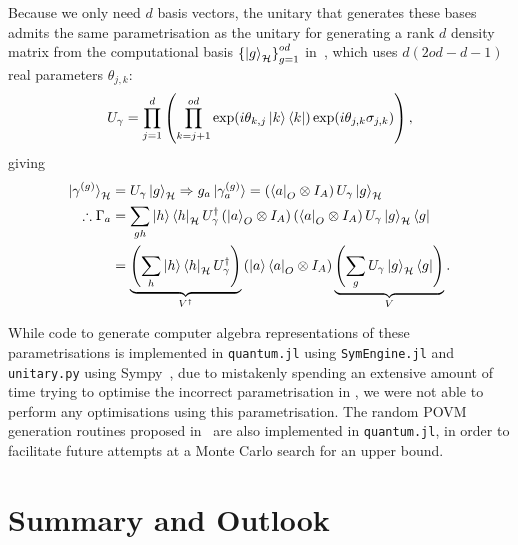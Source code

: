 \documentclass[10pt, a4paper]{article}
\numberwithin{equation}{section} %
\theoremstyle{definition}
\theoremstyle{plain}
\newcommand{\?}{\mathrel{?}} %
\newcommand{\Hs}{\mathcal{H}} %
\begin{document}
                  Because we only need \(d\) basis vectors, the unitary that generates these bases admits the same parametrisation as the unitary for generating a rank \(d\) density matrix from the computational basis \({\{\ket{g}_{\Hs}\}}_{g=1}^{od}\) in~\cite{CompositeParam}, which uses \(d(2od-d-1)\) real parameters \(\theta_{j,k}\):
                  \begin{equation}
                    U_{\gamma} = \prod_{j=1}^d \left( \prod_{k=j+1}^{od} \exp(i\theta_{k,j}\ket{k}\bra{k}) \exp(i\theta_{j,k}\sigma_{j,k}) \right),
                  \end{equation}
                  giving
                  \begin{align}
                    \ket{\gamma^{(g)}}_{\Hs} &= U_{\gamma}\ket{g}_{\Hs} \Rightarrow g_a\ket{\gamma^{(g)}_a} = \left(\bra{a}_O \otimes I_A\right)U_{\gamma}\ket{g}_{\Hs} \\
                    \therefore \Gamma_a &= \sum_{gh} \ket{h}\bra{h}_{\Hs} U_{\gamma}^{\dagger} \left(\ket{a}_O \otimes I_A\right) \left(\bra{a}_O \otimes I_A\right)U_{\gamma}\ket{g}_{\Hs}\bra{g} \\
                                        &= \underbrace{\left(\sum_{h} \ket{h}\bra{h}_{\Hs} U_{\gamma}^{\dagger}\right)}_{V^\dagger} \left(\ket{a}\bra{a}_O \otimes I_A\right) \underbrace{\left(\sum_{g} U_{\gamma}\ket{g}_{\Hs}\bra{g}\right)}_{V}.
                  \end{align}

                  While code to generate computer algebra representations of these parametrisations is implemented in \verb`quantum.jl` using \verb`SymEngine.jl` and \verb`unitary.py` using Sympy~\cite{Sympy}, due to mistakenly spending an extensive amount of time trying to optimise the incorrect parametrisation in , we were not able to perform any optimisations using this parametrisation. The random POVM generation routines proposed in~\cite{RandPOVM} are also implemented in \verb`quantum.jl`, in order to facilitate future attempts at a Monte Carlo search for an upper bound.


                  \section{Summary and Outlook}
\end{document}
